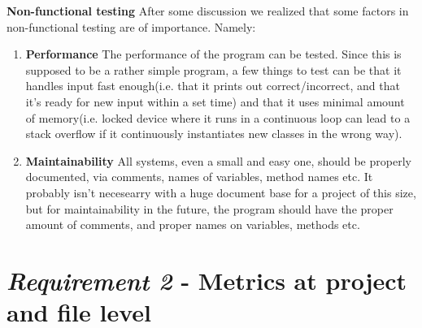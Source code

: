 \documentclass{article}
\begin{document}
	\textbf{Non-functional testing}
	After some discussion we realized that some factors in non-functional testing
	are of importance. Namely:
	\begin{enumerate}
		\item
		\textbf{Performance}
		The performance of the program can be tested. Since this is supposed to be a rather simple program,
		a few things to test can be that it handles input fast enough(i.e. that it prints out correct/incorrect, and that it's ready
		for new input within a set time) and that it uses minimal amount of memory(i.e. locked device where it runs in a continuous
		loop can lead to a stack overflow if it continuously instantiates new classes in the wrong way).

		\item
		\textbf{Maintainability}
		All systems, even a small and easy one, should be properly documented, via comments, names of variables, method names
		etc. It probably isn't necesearry with a huge document base for a project of this size, but for maintainability in the future,
		the program should have the proper amount of comments, and proper names on variables, methods etc.

	\end{enumerate}



\section{\textit{Requirement 2} - Metrics at project and file level}
\end{document}
